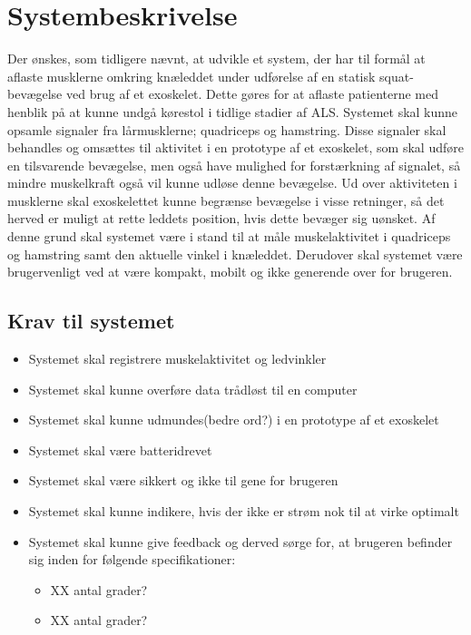 \section{Systembeskrivelse}
Der ønskes, som tidligere nævnt, at udvikle et system, der har til formål at aflaste musklerne omkring knæleddet under udførelse af en statisk squat-bevægelse ved brug af et exoskelet. Dette gøres for at aflaste patienterne med henblik på at kunne undgå kørestol i tidlige stadier af ALS. Systemet skal kunne opsamle signaler fra lårmusklerne; quadriceps og hamstring. Disse signaler skal behandles og omsættes til aktivitet i en prototype af et exoskelet, som skal udføre en tilsvarende bevægelse, men også have mulighed for forstærkning af signalet, så mindre muskelkraft også vil kunne udløse denne bevægelse. Ud over aktiviteten i musklerne skal exoskelettet kunne begrænse bevægelse i visse retninger, så det herved er muligt at rette leddets position, hvis dette bevæger sig uønsket. Af denne grund skal systemet være i stand til at måle muskelaktivitet i quadriceps og hamstring samt den aktuelle vinkel i knæleddet. Derudover skal systemet være brugervenligt ved at være kompakt, mobilt og ikke generende over for brugeren.

\subsection{Krav til systemet} 
\begin{itemize}
\item Systemet skal registrere muskelaktivitet og ledvinkler
\item Systemet skal kunne overføre data trådløst til en computer
\item Systemet skal kunne udmundes(bedre ord?) i en prototype af et exoskelet
\item Systemet skal være batteridrevet
\item Systemet skal være sikkert og ikke til gene for brugeren
\item Systemet skal kunne indikere, hvis der ikke er strøm nok til at virke optimalt 
\item Systemet skal kunne give feedback og derved sørge for, at brugeren befinder sig inden for følgende specifikationer:
\begin{itemize}
\item XX antal grader?
\item XX antal grader?
\end{itemize}
\end{itemize}

